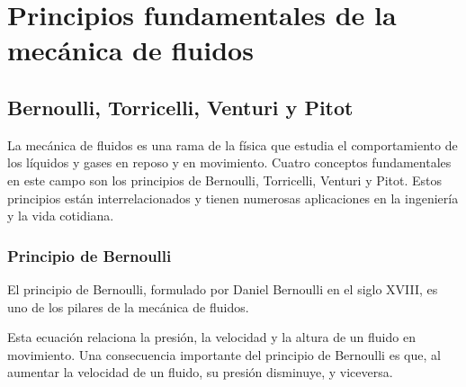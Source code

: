 \documentclass[../main]{subfiles}
\begin{document}
\chapter{Principios fundamentales de la mecánica de fluidos}

\section{Bernoulli, Torricelli, Venturi y Pitot}

La mecánica de fluidos es una rama de la física que estudia el comportamiento de los líquidos y gases en reposo y en movimiento. Cuatro conceptos fundamentales en este campo son los principios de Bernoulli, Torricelli, Venturi y Pitot. Estos principios están interrelacionados y tienen numerosas aplicaciones en la ingeniería y la vida cotidiana.

\subsection{Principio de Bernoulli}

El principio de Bernoulli, formulado por Daniel Bernoulli en el siglo XVIII, es uno de los pilares de la mecánica de fluidos.


Esta ecuación relaciona la presión, la velocidad y la altura de un fluido en movimiento. Una consecuencia importante del principio de Bernoulli es que, al aumentar la velocidad de un fluido, su presión disminuye, y viceversa.
\end{document}
